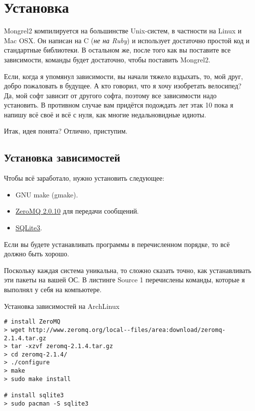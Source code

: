 \chapter{Установка}

Mongrel2 компилируется на большинстве Unix-систем, в частности на Linux и Mac OSX.
Он написан на C (\emph{не на Ruby}) и использует достаточно простой код и стандартные
библиотеки. В остальном же, после того как вы поставите все зависимости,
команды  будет достаточно, чтобы поставить Mongrel2.

Если, когда я упомянул зависимости, вы начали тяжело вздыхать, то, мой друг,
добро пожаловать в будущее. А кто говорил, что я хочу изобретать велосипед?
Да, мой софт зависит от другого софта, поэтому все зависимости надо установить.
В противном случае вам придётся подождать лет этак 10 пока я напишу всё своё
и всё с нуля, как многие недальновидные идиоты.

Итак, идея понята? Отлично, приступим.

\section{Установка зависимостей}

Чтобы всё заработало, нужно установить следующее:

\begin{itemize}
\item GNU make (gmake).
\item \href{http://zeromq.org}{ZeroMQ 2.0.10} для передачи сообщений.
\item \href{http://www.sqlite.org/}{SQLite3}.
\end{itemize}

Если вы будете устанавливать программы в перечисленном порядке, то всё должно быть хорошо.

Поскольку каждая система уникальна, то сложно сказать точно, как устанавливать
эти пакеты на вашей ОС. В листинге Source 1 перечислены команды, которые я
выполнял у себя на компьютере.

\begin{code}{Установка зависимостей на ArchLinux}
\begin{lstlisting}
# install ZeroMQ
> wget http://www.zeromq.org/local--files/area:download/zeromq-2.1.4.tar.gz
> tar -xzvf zeromq-2.1.4.tar.gz
> cd zeromq-2.1.4/
> ./configure
> make
> sudo make install

# install sqlite3
> sudo pacman -S sqlite3
\end{lstlisting}
\end{code}

